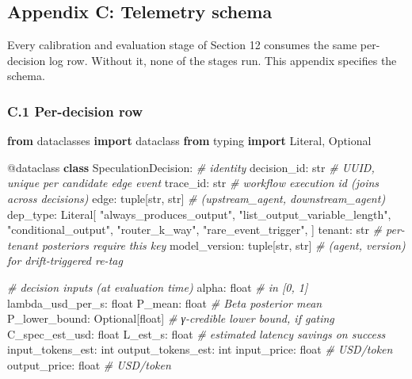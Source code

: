 \documentclass[
  11pt,
]{article}
\newenvironment{Shaded}{}{}
\newcommand{\AttributeTok}[1]{\textcolor[rgb]{0.49,0.56,0.16}{#1}}
\newcommand{\BuiltInTok}[1]{\textcolor[rgb]{0.00,0.50,0.00}{#1}}
\newcommand{\CommentTok}[1]{\textcolor[rgb]{0.38,0.63,0.69}{\textit{#1}}}
\newcommand{\ImportTok}[1]{\textcolor[rgb]{0.00,0.50,0.00}{\textbf{#1}}}
\newcommand{\KeywordTok}[1]{\textcolor[rgb]{0.00,0.44,0.13}{\textbf{#1}}}
\newcommand{\NormalTok}[1]{#1}
\newcommand{\StringTok}[1]{\textcolor[rgb]{0.25,0.44,0.63}{#1}}
\newcounter{none} %
\begin{document}
\subsection{Appendix C: Telemetry
schema}\label{appendix-c-telemetry-schema}

Every calibration and evaluation stage of Section 12 consumes the same
per-decision log row. Without it, none of the stages run. This appendix
specifies the schema.

\subsubsection{C.1 Per-decision row}\label{c.1-per-decision-row}

\begin{Shaded}
\begin{Highlighting}[]
\ImportTok{from}\NormalTok{ dataclasses }\ImportTok{import}\NormalTok{ dataclass}
\ImportTok{from}\NormalTok{ typing }\ImportTok{import}\NormalTok{ Literal, Optional}

\AttributeTok{@dataclass}
\KeywordTok{class}\NormalTok{ SpeculationDecision:}
    \CommentTok{\# identity}
\NormalTok{    decision\_id: }\BuiltInTok{str}                       \CommentTok{\# UUID, unique per candidate edge event}
\NormalTok{    trace\_id: }\BuiltInTok{str}                          \CommentTok{\# workflow execution id (joins across decisions)}
\NormalTok{    edge: }\BuiltInTok{tuple}\NormalTok{[}\BuiltInTok{str}\NormalTok{, }\BuiltInTok{str}\NormalTok{]                  }\CommentTok{\# (upstream\_agent, downstream\_agent)}
\NormalTok{    dep\_type: Literal[}
        \StringTok{"always\_produces\_output"}\NormalTok{,}
        \StringTok{"list\_output\_variable\_length"}\NormalTok{,}
        \StringTok{"conditional\_output"}\NormalTok{,}
        \StringTok{"router\_k\_way"}\NormalTok{,}
        \StringTok{"rare\_event\_trigger"}\NormalTok{,}
\NormalTok{    ]}
\NormalTok{    tenant: }\BuiltInTok{str}                            \CommentTok{\# per{-}tenant posteriors require this key}
\NormalTok{    model\_version: }\BuiltInTok{tuple}\NormalTok{[}\BuiltInTok{str}\NormalTok{, }\BuiltInTok{str}\NormalTok{]         }\CommentTok{\# (agent, version) for drift{-}triggered re{-}tag}

    \CommentTok{\# decision inputs (at evaluation time)}
\NormalTok{    alpha: }\BuiltInTok{float}                           \CommentTok{\# in [0, 1]}
\NormalTok{    lambda\_usd\_per\_s: }\BuiltInTok{float}
\NormalTok{    P\_mean: }\BuiltInTok{float}                          \CommentTok{\# Beta posterior mean}
\NormalTok{    P\_lower\_bound: Optional[}\BuiltInTok{float}\NormalTok{]         }\CommentTok{\# γ{-}credible lower bound, if gating}
\NormalTok{    C\_spec\_est\_usd: }\BuiltInTok{float}
\NormalTok{    L\_est\_s: }\BuiltInTok{float}                         \CommentTok{\# estimated latency savings on success}
\NormalTok{    input\_tokens\_est: }\BuiltInTok{int}
\NormalTok{    output\_tokens\_est: }\BuiltInTok{int}
\NormalTok{    input\_price: }\BuiltInTok{float}                     \CommentTok{\# USD/token}
\NormalTok{    output\_price: }\BuiltInTok{float}                    \CommentTok{\# USD/token}


\end{Highlighting}
\end{Shaded}
\end{document}
